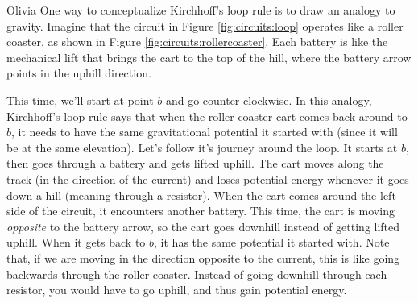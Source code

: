 \begin{studentOpinion}{Olivia}
One way to conceptualize Kirchhoff's loop rule is to draw an analogy to gravity. Imagine that the circuit in Figure \ref{fig:circuits:loop} operates like a roller coaster, as shown in Figure \ref{fig:circuits:rollercoaster}. Each battery is like the mechanical lift that brings the cart to the top of the hill, where the battery arrow points in the uphill direction. 

This time, we'll start at point $b$ and go counter clockwise. In this analogy, Kirchhoff's loop rule says that when the roller coaster cart comes back around to $b$, it needs to have the same gravitational potential it started with (since it will be at the same elevation). Let's follow it's journey around the loop. It starts at $b$, then goes through a battery and gets lifted uphill. The cart moves along the track (in the direction of the current) and loses potential energy whenever it goes down a hill (meaning through a resistor). When the cart comes around the left side of the circuit, it encounters another battery. This time, the cart is moving \textit{opposite} to the battery arrow, so the cart goes downhill instead of getting lifted uphill. When it gets back to $b$, it has the same potential it started with. Note that, if we are moving in the direction opposite to the current, this is like going backwards through the roller coaster. Instead of going downhill through each resistor, you would have to go uphill, and thus gain potential energy.
\end{studentOpinion}

